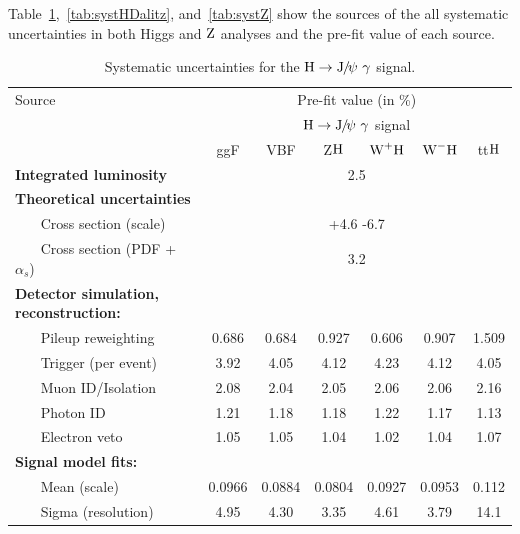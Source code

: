 		Table~\ref{tab:systHJpsiG},~\ref{tab:systHDalitz}, and~\ref{tab:systZ} show the sources of the all systematic uncertainties in both Higgs and $\mathrm{Z}$ analyses and the pre-fit value of each source. 
		
		\begin{table}[!ht]
		\scriptsize
		  \begin{center}
		    
		    \begin{tabular}{lcccccc}
		      \hline
		      Source & \multicolumn{6}{c}{Pre-fit value (in \%)} \\
		      \cline{2-7}
		      & \multicolumn{6}{c}{$\mathrm{H}\to{\mathrm{J}\hspace{-.08em}/\hspace{-.14em}\psi}\ \gamma$ signal} \\ 
		      & ggF &  VBF & Z$\mathrm{H}$ & $\text{W}^{+}\mathrm{H}$ & $\text{W}^{-}\mathrm{H}$ & tt$\mathrm{H}$ \\
		      \hline
		      \textbf{Integrated luminosity} & \multicolumn{6}{c}{2.5}\\
		      \textbf{Theoretical uncertainties} & \multicolumn{6}{c}{ } \\
		      ~~~ Cross section (scale) & \multicolumn{6}{c}{+4.6 -6.7} \\
		      ~~~ Cross section (PDF + $\alpha_{s}$) & \multicolumn{6}{c}{3.2} \\
		      \textbf{Detector simulation, reconstruction:} & \multicolumn{6}{c}{ }\\
		      ~~~ Pileup reweighting  &  0.686 & 0.684 & 0.927 & 0.606 & 0.907 & 1.509       \\
		      ~~~ Trigger (per event) & 3.92 & 4.05 & 4.12 & 4.23 & 4.12 & 4.05  \\ 
		      ~~~ Muon ID/Isolation &  2.08 & 2.04 & 2.05 & 2.06 & 2.06 & 2.16\\
		      ~~~ Photon ID &  1.21 & 1.18 & 1.18 & 1.22 & 1.17 & 1.13 \\
		      ~~~ Electron veto & 1.05 & 1.05 & 1.04 & 1.02 & 1.04 & 1.07 \\
		      \textbf{Signal model fits:} & \multicolumn{6}{c}{ }\\
		      ~~~ Mean (scale)  & 0.0966 & 0.0884 & 0.0804 & 0.0927 & 0.0953 & 0.112 \\
		      ~~~ Sigma (resolution)  & 4.95 & 4.30 & 3.35 & 4.61 & 3.79 & 14.1\\
		      \hline
		    \end{tabular}
		    \caption{Systematic uncertainties for the $\mathrm{H}\to{\mathrm{J}\hspace{-.08em}/\hspace{-.14em}\psi}\ \gamma$ signal.\label{tab:systHJpsiG}}
		  \end{center}
		\end{table}
		
